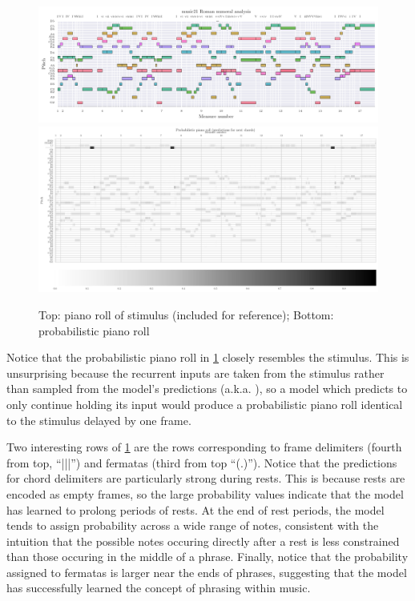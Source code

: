 \begin{figure}[htpb]
    \centering
    ~~\includegraphics[width=0.99\linewidth]{model-analysis-input-piano-roll.pdf}
    \includegraphics[trim={0 0 0 1.4cm},clip,width=1.0\linewidth]{model-analysis-probabilistic-piano-roll.pdf}
    \caption{Top: piano roll of stimulus (included for reference); Bottom: probabilistic piano roll}
    \label{fig:model-analysis-probabilistic-piano-roll}
\end{figure}

Notice that the probabilistic piano roll in
\cref{fig:model-analysis-probabilistic-piano-roll} closely resembles the
stimulus. This is unsurprising because the recurrent inputs are taken from the
stimulus rather than sampled from the model's predictions (a.k.a.
\citep{williams1989learning}), so a model which predicts to only continue holding
its input would produce a probabilistic piano roll identical to the stimulus
delayed by one frame.

Two interesting rows of \cref{fig:model-analysis-probabilistic-piano-roll}
are the rows corresponding to frame delimiters (fourth from top, ``|||'') and
fermatas (third from top ``(.)''). Notice that the predictions for chord
delimiters are particularly strong during rests. This is because rests are
encoded as empty frames, so the large probability values indicate that the
model has learned to prolong periods of rests. At the end of rest periods, the
model tends to assign probability across a wide range of notes, consistent with
the intuition that the possible notes occuring directly after a rest is less
constrained than  those occuring in the middle of a
phrase. Finally, notice that the probability assigned to fermatas is larger
near the ends of phrases, suggesting that the model has successfully learned
the concept of phrasing within music.

